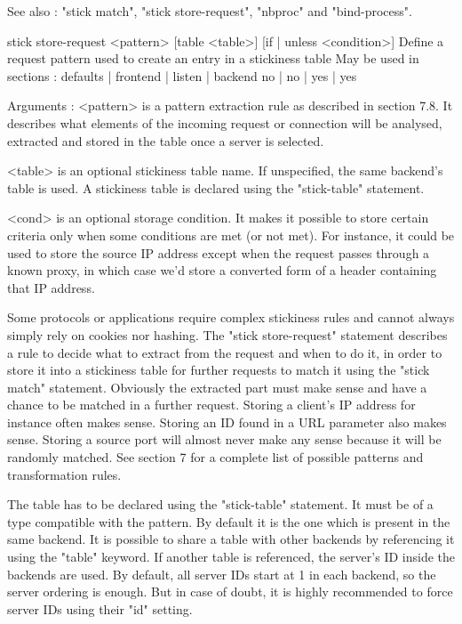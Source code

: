   See also : "stick match", "stick store-request", "nbproc" and "bind-process".


stick store-request <pattern> [table <table>] [{if | unless} <condition>]
  Define a request pattern used to create an entry in a stickiness table
  May be used in sections :   defaults | frontend | listen | backend
                                 no    |    no    |   yes  |   yes

  Arguments :
    <pattern>  is a pattern extraction rule as described in section 7.8. It
               describes what elements of the incoming request or connection
               will be analysed, extracted and stored in the table once a
               server is selected.

    <table>    is an optional stickiness table name. If unspecified, the same
               backend's table is used. A stickiness table is declared using
               the "stick-table" statement.

    <cond>     is an optional storage condition. It makes it possible to store
               certain criteria only when some conditions are met (or not met).
               For instance, it could be used to store the source IP address
               except when the request passes through a known proxy, in which
               case we'd store a converted form of a header containing that IP
               address.

  Some protocols or applications require complex stickiness rules and cannot
  always simply rely on cookies nor hashing. The "stick store-request" statement
  describes a rule to decide what to extract from the request and when to do
  it, in order to store it into a stickiness table for further requests to
  match it using the "stick match" statement. Obviously the extracted part must
  make sense and have a chance to be matched in a further request. Storing a
  client's IP address for instance often makes sense. Storing an ID found in a
  URL parameter also makes sense. Storing a source port will almost never make
  any sense because it will be randomly matched. See section 7 for a complete
  list of possible patterns and transformation rules.

  The table has to be declared using the "stick-table" statement. It must be of
  a type compatible with the pattern. By default it is the one which is present
  in the same backend. It is possible to share a table with other backends by
  referencing it using the "table" keyword. If another table is referenced,
  the server's ID inside the backends are used. By default, all server IDs
  start at 1 in each backend, so the server ordering is enough. But in case of
  doubt, it is highly recommended to force server IDs using their "id" setting.


